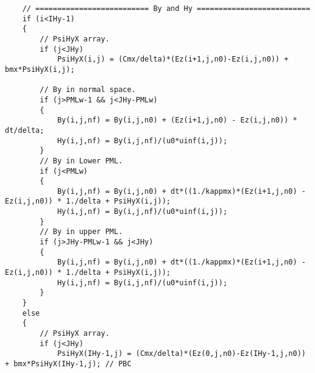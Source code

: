 \begin{lstlisting}
	// ========================== By and Hy ==========================
	if (i<IHy-1)
	{
		// PsiHyX array.
		if (j<JHy)
			PsiHyX(i,j) = (Cmx/delta)*(Ez(i+1,j,n0)-Ez(i,j,n0)) + bmx*PsiHyX(i,j);

		// By in normal space.
		if (j>PMLw-1 && j<JHy-PMLw)
		{
			By(i,j,nf) = By(i,j,n0) + (Ez(i+1,j,n0) - Ez(i,j,n0)) * dt/delta;
			Hy(i,j,nf) = By(i,j,nf)/(u0*uinf(i,j));
		}
		// By in Lower PML.
		if (j<PMLw)
		{
			By(i,j,nf) = By(i,j,n0) + dt*((1./kappmx)*(Ez(i+1,j,n0) - Ez(i,j,n0)) * 1./delta + PsiHyX(i,j));
			Hy(i,j,nf) = By(i,j,nf)/(u0*uinf(i,j));
		}
		// By in upper PML.
		if (j>JHy-PMLw-1 && j<JHy)
		{
			By(i,j,nf) = By(i,j,n0) + dt*((1./kappmx)*(Ez(i+1,j,n0) - Ez(i,j,n0)) * 1./delta + PsiHyX(i,j));
			Hy(i,j,nf) = By(i,j,nf)/(u0*uinf(i,j));
		}
	}
	else
	{
		// PsiHyX array.
		if (j<JHy)
			PsiHyX(IHy-1,j) = (Cmx/delta)*(Ez(0,j,n0)-Ez(IHy-1,j,n0)) + bmx*PsiHyX(IHy-1,j); // PBC


\end{lstlisting}
